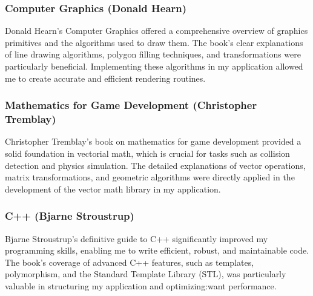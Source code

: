                     \subsubsection{Computer Graphics (Donald Hearn)}
                        Donald Hearn's Computer Graphics offered a comprehensive overview of graphics
                        primitives and the algorithms used to draw them. The book's clear explanations
                        of line drawing algorithms, polygon filling techniques, and transformations were
                        particularly beneficial. Implementing these algorithms in my application allowed
                        me to create accurate and efficient rendering routines.
                    \subsubsection{Mathematics for Game Development (Christopher Tremblay)}
                        Christopher Tremblay's book on
                        mathematics for game development provided a solid
                        foundation in vectorial math, which is crucial for tasks
                        such as collision detection and physics simulation. The
                        detailed explanations of vector operations, matrix
                        transformations, and geometric algorithms were directly
                        applied in the development of the vector math library in
                        my application.
                    \subsubsection{C++ (Bjarne Stroustrup)}
                        Bjarne Stroustrup's definitive
                        guide to C++ significantly improved my programming
                        skills, enabling me to write efficient, robust, and
                        maintainable code. The book's coverage of advanced C++
                        features, such as templates, polymorphism, and the
                        Standard Template Library (STL), was particularly
                        valuable in structuring my application and optimizing:want
                        performance.
